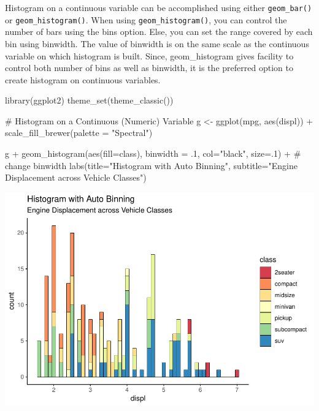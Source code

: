 \documentclass[a4paper]{article}
\newenvironment{Shaded}{}{}
\newcommand{\KeywordTok}[1]{\textcolor[rgb]{0.00,0.00,1.00}{#1}}
\newcommand{\DataTypeTok}[1]{#1}
\newcommand{\DecValTok}[1]{#1}
\newcommand{\StringTok}[1]{\textcolor[rgb]{0.00,0.50,0.50}{#1}}
\newcommand{\CommentTok}[1]{\textcolor[rgb]{0.00,0.50,0.00}{#1}}
\newcommand{\OperatorTok}[1]{#1}
\newcommand{\NormalTok}[1]{#1}
\begin{document}
Histogram on a continuous variable can be accomplished using either
\texttt{geom\_bar()} or \texttt{geom\_histogram()}. When using
\texttt{geom\_histogram()}, you can control the number of bars using the
bins option. Else, you can set the range covered by each bin using
binwidth. The value of binwidth is on the same scale as the continuous
variable on which histogram is built. Since, geom\_histogram gives
facility to control both number of bins as well as binwidth, it is the
preferred option to create histogram on continuous variables.

\begin{Shaded}
\begin{Highlighting}[]
\KeywordTok{library}\NormalTok{(ggplot2)}
\KeywordTok{theme_set}\NormalTok{(}\KeywordTok{theme_classic}\NormalTok{())}

\CommentTok{# Histogram on a Continuous (Numeric) Variable}
\NormalTok{g <-}\StringTok{ }\KeywordTok{ggplot}\NormalTok{(mpg, }\KeywordTok{aes}\NormalTok{(displ)) }\OperatorTok{+}\StringTok{ }\KeywordTok{scale_fill_brewer}\NormalTok{(}\DataTypeTok{palette =} \StringTok{"Spectral"}\NormalTok{)}

\NormalTok{g }\OperatorTok{+}\StringTok{ }\KeywordTok{geom_histogram}\NormalTok{(}\KeywordTok{aes}\NormalTok{(}\DataTypeTok{fill=}\NormalTok{class), }
                   \DataTypeTok{binwidth =}\NormalTok{ .}\DecValTok{1}\NormalTok{, }
                   \DataTypeTok{col=}\StringTok{"black"}\NormalTok{, }
                   \DataTypeTok{size=}\NormalTok{.}\DecValTok{1}\NormalTok{) }\OperatorTok{+}\StringTok{  }\CommentTok{# change binwidth}
\StringTok{  }\KeywordTok{labs}\NormalTok{(}\DataTypeTok{title=}\StringTok{"Histogram with Auto Binning"}\NormalTok{, }
       \DataTypeTok{subtitle=}\StringTok{"Engine Displacement across Vehicle Classes"}\NormalTok{)  }
\end{Highlighting}
\end{Shaded}

\includegraphics{M24-ggplot2_Gallery_files/figure-latex/unnamed-chunk-22-1.pdf}
\end{document}
